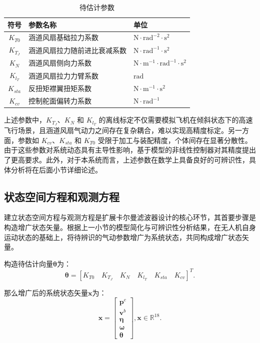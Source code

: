 \begin{table}[htbp]
    \centering
    \caption{\label{tab:params_est}待估计参数}
    \begin{tabular}{cll}
    \toprule
    符号 & 参数名称 & 单位\tabularnewline
    \midrule
    $K_{T0}$ \hfill & 涵道风扇基础拉力系数 & $\mathrm{N \cdot rad ^{-2} \cdot s^2}$ \tabularnewline
    $K_{T_J}$ \hfill & 涵道风扇拉力随前进比衰减系数 &  $\mathrm{N \cdot rad ^{-1} \cdot s^2}$ \tabularnewline
    $K_{N}$ \hfill & 涵道风扇侧向力系数 & $\mathrm{N \cdot m^{-1} \cdot rad ^{-1} \cdot s^2}$ \tabularnewline
    $K_{l_T}$ \hfill & 涵道风扇拉力力臂系数 & $\mathrm{rad}$ \tabularnewline
    $K_{sta}$ \hfill & 反扭矩襟翼扭矩系数 & $\mathrm{N \cdot m^{-1} \cdot s^2}$ \tabularnewline
    $K_{cv}$ \hfill & 控制舵面偏转力系数 & $\mathrm{N \cdot rad^{-1}}$ \tabularnewline
    \bottomrule
    \end{tabular}
\end{table}

上述参数中，$K_{T_J}$、$K_{N}$ 和 $K_{l_T}$ 的离线标定不仅需要模拟飞机在倾斜状态下的高速飞行场景，且涵道风扇气动力之间存在复杂耦合，难以实现高精度标定。另一方面，参数如 $K_{cv}$、$K_{sta}$ 和 $K_{T0}$ 受限于加工与装配精度，个体间存在显著分散性。由于这些参数对系统动态具有主导性影响，基于模型的非线性控制器对其精度提出了更高要求。此外，对于本系统而言，上述参数在数学上具备良好的可辨识性，具体分析将在后面小节详细论述。

\subsection{状态空间方程和观测方程} %
建立状态空间方程与观测方程是扩展卡尔曼滤波器设计的核心环节，其首要步骤是构造增广状态矢量。根据上一小节的模型简化与可辨识性分析结果，在无人机自身运动状态的基础上，将待辨识的气动参数增广为系统状态，共同构成增广状态矢量。

构造待估计向量$\boldsymbol{\theta}$为：
\begin{equation}
    \boldsymbol{\theta} = [
        K_{T0} \quad K_{T_J} \quad K_{N} \quad K_{l_T} \quad K_{sta} \quad K_{cv}]^T.
\end{equation}

那么增广后的系统状态矢量$\boldsymbol{x}$为：
\begin{equation}
    \boldsymbol{x} = 
    \begin{bmatrix}
        \boldsymbol{p}^e \\
        \boldsymbol{v}^b \\
        \boldsymbol{\eta} \\
        \boldsymbol{\omega} \\
        \boldsymbol{\theta}
    \end{bmatrix},
    \boldsymbol{x} \in \mathbb{R}^{18}.
\end{equation}

